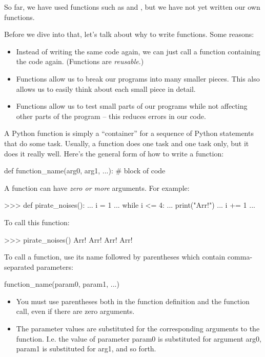 \documentclass[11pt]{cselabheader}
\begin{document}
{So far, we have used functions such as  and
, but we have not yet written our own functions.

Before we dive into that, let's talk about why to write functions. Some reasons:
\begin{itemize}
  \item Instead of writing the same code again, we can just call a function
    containing the code again. (Functions are \emph{reusable}.)
  \item Functions allow us to break our programs into many smaller pieces. This
    also allows us to easily think about each small piece in detail.
  \item Functions allow us to test small parts of our programs while not
    affecting other parts of the program -- this reduces errors in our code.
\end{itemize}

A Python function is simply a ``container'' for a sequence of Python statements
that do some task. Usually, a function does one task and one task only, but it
does it really well. Here's the general form of how to write a function:

\begin{python3code}
def function_name(arg0, arg1, ...):
    # block of code
\end{python3code}

A function can have \emph{zero or more} arguments. For example:

\begin{pyconcode}
>>> def pirate_noises():
...     i = 1
...     while i <= 4:
...         print("Arr!")
...         i += 1
...
\end{pyconcode}

To call this function:

\begin{pyconcode}
>>> pirate_noises()
Arr!
Arr!
Arr!
Arr!
\end{pyconcode}

To call a function, use its name followed by parentheses which contain
comma-separated parameters:

\begin{python3code}
function_name(param0, param1, ...)
\end{python3code}

\begin{itemize}
  \item You must use parentheses both in the function definition and the function
    call, even if there are zero arguments.
  \item The parameter values are substituted for the corresponding arguments to
    the function. I.e. the value of parameter param0 is substituted for argument
    arg0, param1 is substituted for arg1, and so forth.
\end{itemize}

}
\end{document}
